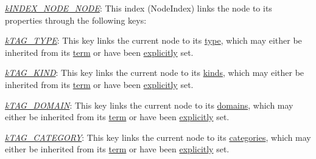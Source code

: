 \begin{DoxyItemize}
\item {\itshape \hyperlink{}{k\-I\-N\-D\-E\-X\-\_\-\-N\-O\-D\-E\-\_\-\-N\-O\-D\-E}}\-: This index (Node\-Index) links the node to its properties through the following keys\-: 
\begin{DoxyItemize}
\item {\itshape \hyperlink{}{k\-T\-A\-G\-\_\-\-T\-Y\-P\-E}}\-: This key links the current node to its \hyperlink{class_c_ontology_node_a23d374948e7f950726d60163db05c154}{type}, which may either be inherited from its \hyperlink{class_c_ontology_node_a2f294a9c93079f58190cedbdd0c09068}{term} or have been \hyperlink{class_c_ontology_node_a23d374948e7f950726d60163db05c154}{explicitly} set. 
\item {\itshape \hyperlink{}{k\-T\-A\-G\-\_\-\-K\-I\-N\-D}}\-: This key links the current node to its \hyperlink{class_c_ontology_node_abfe1cb2e10bb53cf7d500c9860e5cb7a}{kinds}, which may either be inherited from its \hyperlink{class_c_ontology_node_a2f294a9c93079f58190cedbdd0c09068}{term} or have been \hyperlink{class_c_ontology_node_abfe1cb2e10bb53cf7d500c9860e5cb7a}{explicitly} set. 
\item {\itshape \hyperlink{}{k\-T\-A\-G\-\_\-\-D\-O\-M\-A\-I\-N}}\-: This key links the current node to its \hyperlink{class_c_ontology_node_ab96f5c462f470348d014ae0efe43005e}{domains}, which may either be inherited from its \hyperlink{class_c_ontology_node_a2f294a9c93079f58190cedbdd0c09068}{term} or have been \hyperlink{class_c_ontology_node_ab96f5c462f470348d014ae0efe43005e}{explicitly} set. 
\item {\itshape \hyperlink{}{k\-T\-A\-G\-\_\-\-C\-A\-T\-E\-G\-O\-R\-Y}}\-: This key links the current node to its \hyperlink{class_c_ontology_node_a414cd8f920944bed65962492ddb9ce2c}{categories}, which may either be inherited from its \hyperlink{class_c_ontology_node_a414cd8f920944bed65962492ddb9ce2c}{term} or have been \hyperlink{class_c_ontology_node_a414cd8f920944bed65962492ddb9ce2c}{explicitly} set. 
\end{DoxyItemize}
\end{DoxyItemize}


